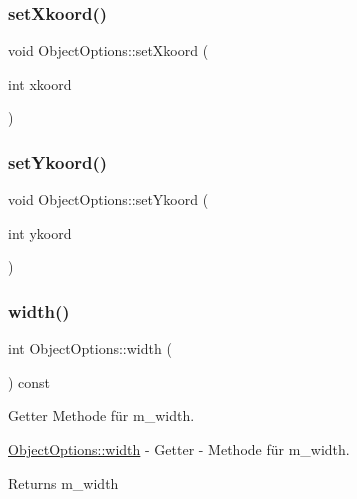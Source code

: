 \subsubsection{\texorpdfstring{set\+Xkoord()}{setXkoord()}}
{\footnotesize\ttfamily void Object\+Options\+::set\+Xkoord (\begin{DoxyParamCaption}\item[{int}]{xkoord }\end{DoxyParamCaption})}

\mbox{\label{class_object_options_a32b59030cadbd75a09ed0056df03d342}} 
\subsubsection{\texorpdfstring{set\+Ykoord()}{setYkoord()}}
{\footnotesize\ttfamily void Object\+Options\+::set\+Ykoord (\begin{DoxyParamCaption}\item[{int}]{ykoord }\end{DoxyParamCaption})}

\mbox{\label{class_object_options_a57594cc38acb8ebf466bb41538a35a8b}} 
\subsubsection{\texorpdfstring{width()}{width()}}
{\footnotesize\ttfamily int Object\+Options\+::width (\begin{DoxyParamCaption}{ }\end{DoxyParamCaption}) const}



Getter Methode für m\+\_\+width. 

\hyperlink{class_object_options_a57594cc38acb8ebf466bb41538a35a8b}{Object\+Options\+::width} -\/ Getter -\/ Methode für m\+\_\+width.

\begin{DoxyReturn}{Returns}
m\+\_\+width


\end{DoxyReturn}
\mbox{\label{class_object_options_a738e07899e3eff5aeb2f998bf527b804}} 
